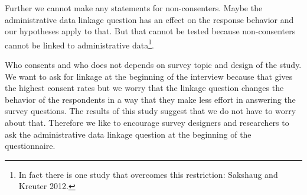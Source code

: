 Further we cannot make any statements for non-consenters. Maybe the administrative data linkage question has an effect on the response behavior and our hypotheses apply to that. But that cannot be tested because non-consenters cannot be linked to administrative data\footnote{In fact there is one study that overcomes this restriction: Sakshaug and Kreuter 2012.}.

Who consents and who does not depends on survey topic and design of the study. We want to ask for linkage at the beginning of the interview because that gives the highest consent rates but we worry that the linkage question changes the behavior of the respondents in a way that they make less effort in answering the survey questions. The results of this study suggest that we do not have to worry about that. Therefore we like to encourage survey designers and researchers to ask the administrative data linkage question at the beginning of the questionnaire.





